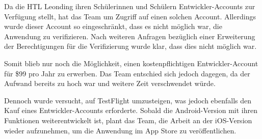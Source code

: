 Da die HTL Leonding ihren Schülerinnen und Schülern Entwickler-Accounts zur Verfügung stellt, hat das Team um Zugriff auf einen solchen Account. Allerdings wurde dieser Account so eingeschränkt, dass es nicht möglich war, die Anwendung zu verifizieren. Nach weiteren Anfragen bezüglich einer Erweiterung der Berechtigungen für die Verifizierung wurde klar, dass dies nicht möglich war.

Somit blieb nur noch die Möglichkeit, einen kostenpflichtigen Entwickler-Account für \$99 pro Jahr zu erwerben. Das Team entschied sich jedoch dagegen, da der Aufwand bereits zu hoch war und weitere Zeit verschwendet würde.

Dennoch wurde versucht, auf TestFlight umzusteigen, was jedoch ebenfalls den Kauf eines Entwickler-Accounts erforderte. Sobald die Android-Version mit ihren Funktionen weiterentwickelt ist, plant das Team, die Arbeit an der iOS-Version wieder aufzunehmen, um die Anwendung im App Store zu veröffentlichen.






